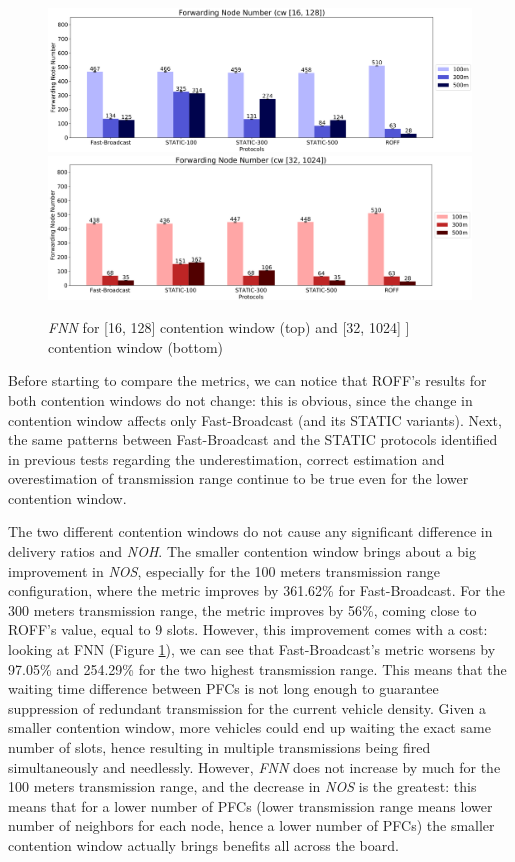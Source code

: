 		\begin{figure}[H]
			\centering
			\includegraphics[width=1.0\textwidth]{immagini/la-25/cw/16/fnn}
			\includegraphics[width=1.0\textwidth]{immagini/la-25/cw/32/fnn}
			\caption{\textit{FNN} for [16, 128] contention window (top) and [32, 1024] ] contention window (bottom)}
			\label{fig:la-cw-fnn}
		\end{figure}
	
		Before starting to compare the metrics, we can notice that ROFF's results for both contention windows do not change: this is obvious, since the change in contention window affects only Fast-Broadcast (and its STATIC variants). Next, the same patterns between Fast-Broadcast and the STATIC protocols identified in previous tests regarding the underestimation, correct estimation and overestimation of transmission range continue to be true even for the lower contention window.
		
		
		The two different contention windows do not cause any significant difference in delivery ratios and \textit{NOH}. The smaller contention window brings about a big improvement in \textit{NOS}, especially for the 100 meters transmission range configuration, where the metric improves by 361.62\% for Fast-Broadcast. For the 300 meters transmission range, the metric improves by 56\%, coming close to ROFF's value, equal to 9 slots. However, this improvement comes with a cost: looking at FNN (Figure \ref{fig:la-cw-fnn}), we can see that Fast-Broadcast's metric worsens by 97.05\% and 254.29\% for the two highest transmission range. This means that the waiting time difference between PFCs is not long enough to guarantee suppression of redundant transmission for the current vehicle density. Given a smaller contention window, more vehicles could end up waiting the exact same number of slots, hence resulting in multiple transmissions being fired simultaneously and needlessly. However, \textit{FNN} does not increase by much for the 100 meters transmission range, and the decrease in \textit{NOS} is the greatest: this means that for a lower number of PFCs (lower transmission range means lower number of neighbors for each node, hence a lower number of PFCs) the smaller contention window actually brings benefits all across the board. 
		
